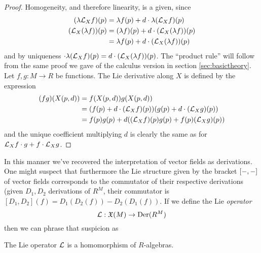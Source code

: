 \begin{proof}
  Homogeneity, and therefore linearity, is a given, since
  \begin{align*}
    (\lambda\mathcal L_Xf)(p)    &= \lambda f(p) + d\cdot\lambda(\mathcal L_Xf)(p)      \\
    (\mathcal L_X(\lambda f))(p) &= (\lambda f)(p) + d\cdot(\mathcal L_X(\lambda f))(p) \\
                           &= \lambda f(p) + d\cdot(\mathcal L_X(\lambda f))(p)
  \end{align*}
  and by uniqueness \( \cdot\lambda(\mathcal L_Xf)(p) = d\cdot(\mathcal L_X(\lambda f))(p) \). The ``product rule'' will follow from the same proof we gave of the calculus version in section \ref{sec:basictheory}. Let \( f,g:M\to R \) be functions. The Lie derivative along \( X \) is defined by the expression
  \begin{align*}
    (fg)(X(p,d)) &= f(X(p,d))g(X(p,d))                                     \\
                 &= (f(p) + d\cdot(\mathcal L_Xf)(p))(g(p) + d\cdot(\mathcal L_Xg)(p)) \\
		 &= f(p)g(p) + d((\mathcal L_Xf)(p)g(p) + f(p)(\mathcal L_Xg)(p))
  \end{align*}
  and the unique coefficient multiplying \( d \) is clearly the same as for \( \mathcal L_Xf\cdot g + f\cdot\mathcal L_Xg \).
\end{proof}

In this manner we've recovered the interpretation of vector fields as derivations. One might suspect that furthermore the Lie structure given by the bracket \( [-,-] \) of vector fields corresponds to the commutator of their respective derivations (given \( D_1,D_2 \) derivations of \( R^M \), their commutator is \( [D_1,D_2](f) = D_1(D_2(f)) - D_2(D_1(f)) \). If we define the Lie \emph{operator}
\begin{equation*}
  \mathcal L: \mathfrak X(M)\to \operatorname{Der}(R^M)
\end{equation*}
then we can phrase that suspicion as

\begin{proposition}
  The Lie operator \( \mathcal L \) is a homomorphism of \( R \)-algebras.
\end{proposition}


